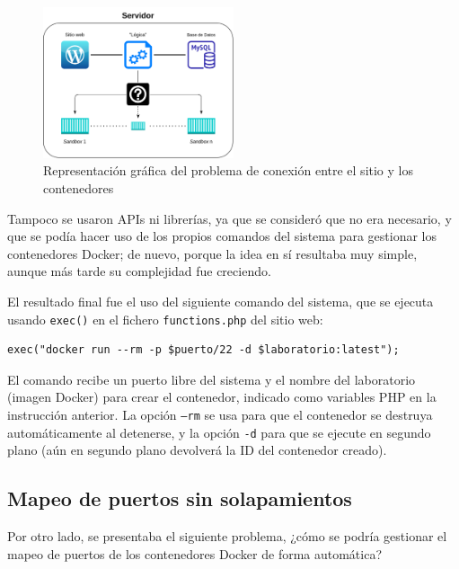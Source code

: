             \begin{figure}[htbp]
                \centering

                \includegraphics[width=0.5\textwidth]{images/Diagramas/conexion.png}
                \caption{Representación gráfica del problema de conexión entre el sitio y los contenedores}
                \label{fig:conexion}
            \end{figure}

            Tampoco se usaron APIs ni librerías, ya que se consideró que no era necesario, y que se podía hacer uso de los propios comandos del sistema para gestionar los contenedores Docker; de nuevo, porque la idea en sí resultaba muy simple, aunque más tarde su complejidad fue creciendo.

            El resultado final fue el uso del siguiente comando del sistema, que se ejecuta usando \texttt{exec()} en el fichero \texttt{functions.php} del sitio web:
            \\
            
            \begin{lstlisting}[style=php_style]
    exec("docker run --rm -p $puerto/22 -d $laboratorio:latest");
            \end{lstlisting}

            El comando recibe un puerto libre del sistema y el nombre del laboratorio (imagen Docker) para crear el contenedor, indicado como variables PHP en la instrucción anterior. La opción \texttt{--rm} se usa para que el contenedor se destruya automáticamente al detenerse, y la opción \texttt{-d} para que se ejecute en segundo plano (aún en segundo plano devolverá la ID del contenedor creado).


        \subsection{Mapeo de puertos sin solapamientos}

            Por otro lado, se presentaba el siguiente problema, ¿cómo se podría gestionar el mapeo de puertos de los contenedores Docker de forma automática?

